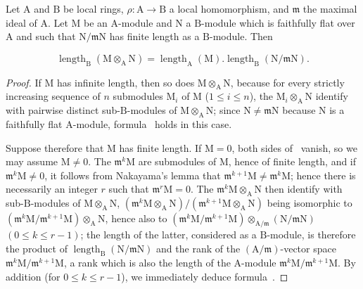 \begin{lemma}[2.5.5.2]
\label{IV.2.5.5.2}
Let $\mathrm{A}$ and $\mathrm{B}$ be local rings,
$\rho:\mathrm{A}\to\mathrm{B}$ a local homomorphism, and
$\mathfrak{m}$ the maximal ideal of $\mathrm{A}$. Let $\mathrm{M}$ be an
$\mathrm{A}$-module and $\mathrm{N}$ a $\mathrm{B}$-module which is
faithfully flat over $\mathrm{A}$ and such that
$\mathrm{N}/\mathfrak{m}\mathrm{N}$ has finite length as a
$\mathrm{B}$-module. Then
\end{lemma}

\begin{env}[2.5.5.3]
\label{IV.2.5.5.3}
\[
  \operatorname{length}_{\mathrm{B}}(\mathrm{M}\otimes_{\mathrm{A}}\mathrm{N}) = \operatorname{length}_{\mathrm{A}}(\mathrm{M}).\operatorname{length}_{\mathrm{B}}(\mathrm{N}/\mathfrak{m}\mathrm{N}).
\]
\end{env}

\begin{proof}
If $\mathrm{M}$ has infinite length, then so does
$\mathrm{M}\otimes_{\mathrm{A}}\mathrm{N}$, because for every strictly
increasing sequence of $n$ submodules $\mathrm{M}_i$ of $\mathrm{M}$
\textnormal{(}$1\leq i\leq n$\textnormal{)}, the
$\mathrm{M}_i\otimes_{\mathrm{A}}\mathrm{N}$ identify with pairwise
distinct sub-$\mathrm{B}$-modules of
$\mathrm{M}\otimes_{\mathrm{A}}\mathrm{N}$; since
$\mathrm{N}\neq\mathfrak{m}\mathrm{N}$ because $\mathrm{N}$ is a
faithfully flat $\mathrm{A}$-module, formula~
holds in this case.

Suppose therefore that $\mathrm{M}$ has finite length. If $\mathrm{M}=0$, both
sides of~ vanish, so we may assume $\mathrm{M}\neq0$. The
$\mathfrak{m}^k\mathrm{M}$ are submodules of $\mathrm{M}$, hence of finite
length, and if $\mathfrak{m}^k\mathrm{M}\neq0$, it follows from Nakayama's
lemma that $\mathfrak{m}^{k+1}\mathrm{M}\neq\mathfrak{m}^k\mathrm{M}$; hence
there is necessarily an integer $r$ such that $\mathfrak{m}^r\mathrm{M}=0$.
The $\mathfrak{m}^k\mathrm{M}\otimes_{\mathrm{A}}\mathrm{N}$ then identify
with sub-$\mathrm{B}$-modules of $\mathrm{M}\otimes_{\mathrm{A}}\mathrm{N}$,
$(\mathfrak{m}^k\mathrm{M}\otimes_{\mathrm{A}}\mathrm{N})/(\mathfrak{m}^{k+1}\mathrm{M}\otimes_{\mathrm{A}}\mathrm{N})$
being isomorphic to
$(\mathfrak{m}^k\mathrm{M}/\mathfrak{m}^{k+1}\mathrm{M})\otimes_{\mathrm{A}}\mathrm{N}$,
hence also to
$(\mathfrak{m}^k\mathrm{M}/\mathfrak{m}^{k+1}\mathrm{M})
\otimes_{\mathrm{A}/\mathfrak{m}}(\mathrm{N}/\mathfrak{m}\mathrm{N})$
$(0\leq k\leq r-1)$; the length of the latter, considered as a
$\mathrm{B}$-module, is therefore the product of
$\operatorname{length}_{\mathrm{B}}(\mathrm{N}/\mathfrak{m}\mathrm{N})$
and the rank of the $(\mathrm{A}/\mathfrak{m})$-vector space
$\mathfrak{m}^k\mathrm{M}/\mathfrak{m}^{k+1}\mathrm{M}$, a rank which is
also the length of the $\mathrm{A}$-module
$\mathfrak{m}^k\mathrm{M}/\mathfrak{m}^{k+1}\mathrm{M}$. By addition
\textnormal{(}for $0\leq k\leq r-1$\textnormal{)}, we immediately deduce
formula~.
\end{proof}

